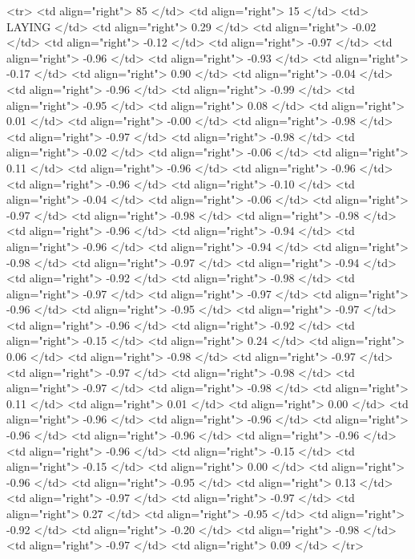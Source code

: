   <tr> <td align="right"> 85 </td> <td align="right">  15 </td> <td> LAYING </td> <td align="right"> 0.29 </td> <td align="right"> -0.02 </td> <td align="right"> -0.12 </td> <td align="right"> -0.97 </td> <td align="right"> -0.96 </td> <td align="right"> -0.93 </td> <td align="right"> -0.17 </td> <td align="right"> 0.90 </td> <td align="right"> -0.04 </td> <td align="right"> -0.96 </td> <td align="right"> -0.99 </td> <td align="right"> -0.95 </td> <td align="right"> 0.08 </td> <td align="right"> 0.01 </td> <td align="right"> -0.00 </td> <td align="right"> -0.98 </td> <td align="right"> -0.97 </td> <td align="right"> -0.98 </td> <td align="right"> -0.02 </td> <td align="right"> -0.06 </td> <td align="right"> 0.11 </td> <td align="right"> -0.96 </td> <td align="right"> -0.96 </td> <td align="right"> -0.96 </td> <td align="right"> -0.10 </td> <td align="right"> -0.04 </td> <td align="right"> -0.06 </td> <td align="right"> -0.97 </td> <td align="right"> -0.98 </td> <td align="right"> -0.98 </td> <td align="right"> -0.96 </td> <td align="right"> -0.94 </td> <td align="right"> -0.96 </td> <td align="right"> -0.94 </td> <td align="right"> -0.98 </td> <td align="right"> -0.97 </td> <td align="right"> -0.94 </td> <td align="right"> -0.92 </td> <td align="right"> -0.98 </td> <td align="right"> -0.97 </td> <td align="right"> -0.97 </td> <td align="right"> -0.96 </td> <td align="right"> -0.95 </td> <td align="right"> -0.97 </td> <td align="right"> -0.96 </td> <td align="right"> -0.92 </td> <td align="right"> -0.15 </td> <td align="right"> 0.24 </td> <td align="right"> 0.06 </td> <td align="right"> -0.98 </td> <td align="right"> -0.97 </td> <td align="right"> -0.97 </td> <td align="right"> -0.98 </td> <td align="right"> -0.97 </td> <td align="right"> -0.98 </td> <td align="right"> 0.11 </td> <td align="right"> 0.01 </td> <td align="right"> 0.00 </td> <td align="right"> -0.96 </td> <td align="right"> -0.96 </td> <td align="right"> -0.96 </td> <td align="right"> -0.96 </td> <td align="right"> -0.96 </td> <td align="right"> -0.96 </td> <td align="right"> -0.15 </td> <td align="right"> -0.15 </td> <td align="right"> 0.00 </td> <td align="right"> -0.96 </td> <td align="right"> -0.95 </td> <td align="right"> 0.13 </td> <td align="right"> -0.97 </td> <td align="right"> -0.97 </td> <td align="right"> 0.27 </td> <td align="right"> -0.95 </td> <td align="right"> -0.92 </td> <td align="right"> -0.20 </td> <td align="right"> -0.98 </td> <td align="right"> -0.97 </td> <td align="right"> 0.09 </td> </tr>
